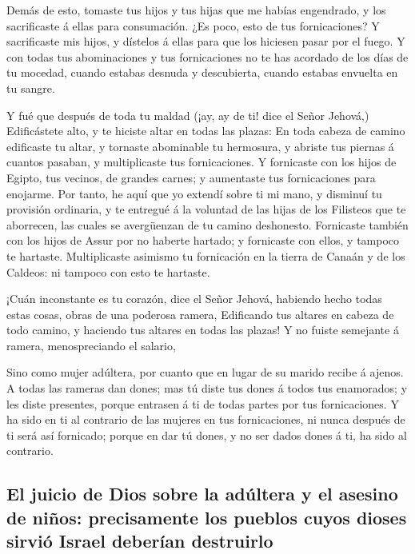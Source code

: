  Demás de esto, tomaste tus hijos y tus hijas que me habías
engendrado, y los sacrificaste á ellas para consumación. ¿Es poco, esto
de tus fornicaciones?  Y sacrificaste mis hijos, y dístelos
á ellas para que los hiciesen pasar por el fuego.  Y con
todas tus abominaciones y tus fornicaciones no te has acordado de los
días de tu mocedad, cuando estabas desnuda y descubierta, cuando estabas
envuelta en tu sangre.

 Y fué que después de toda tu maldad (¡ay, ay de ti! dice
el Señor Jehová,)  Edificástete alto, y te hiciste altar en
todas las plazas:  En toda cabeza de camino edificaste tu
altar, y tornaste abominable tu hermosura, y abriste tus piernas á
cuantos pasaban, y multiplicaste tus fornicaciones.  Y
fornicaste con los hijos de Egipto, tus vecinos, de grandes carnes; y
aumentaste tus fornicaciones para enojarme.  Por tanto, he
aquí que yo extendí sobre ti mi mano, y disminuí tu provisión ordinaria,
y te entregué á la voluntad de las hijas de los Filisteos que te
aborrecen, las cuales se avergüenzan de tu camino deshonesto.
 Fornicaste también con los hijos de Assur por no haberte
hartado; y fornicaste con ellos, y tampoco te hartaste. 
Multiplicaste asimismo tu fornicación en la tierra de Canaán y de los
Caldeos: ni tampoco con esto te hartaste.

 ¡Cuán inconstante es tu corazón, dice el Señor Jehová,
habiendo hecho todas estas cosas, obras de una poderosa ramera,
 Edificando tus altares en cabeza de todo camino, y
haciendo tus altares en todas las plazas! Y no fuiste semejante á
ramera, menospreciando el salario,

 Sino como mujer adúltera, por cuanto que en lugar de su
marido recibe á ajenos.  A todas las rameras dan dones; mas
tú diste tus dones á todos tus enamorados; y les diste presentes, porque
entrasen á ti de todas partes por tus fornicaciones.  Y ha
sido en ti al contrario de las mujeres en tus fornicaciones, ni nunca
después de ti será así fornicado; porque en dar tú dones, y no ser dados
dones á ti, ha sido al contrario.

\hypertarget{el-juicio-de-dios-sobre-la-aduxfaltera-y-el-asesino-de-niuxf1os-precisamente-los-pueblos-cuyos-dioses-sirviuxf3-israel-deberuxedan-destruirlo}{%
\subsection{El juicio de Dios sobre la adúltera y el asesino de niños:
precisamente los pueblos cuyos dioses sirvió Israel deberían
destruirlo}\label{el-juicio-de-dios-sobre-la-aduxfaltera-y-el-asesino-de-niuxf1os-precisamente-los-pueblos-cuyos-dioses-sirviuxf3-israel-deberuxedan-destruirlo}}

